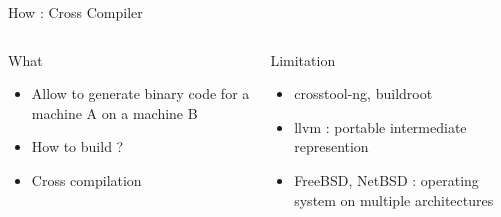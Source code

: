 %
\begin{Frame}{How : Cross Compiler}
  \begin{columns}[t]
    \begin{column}{\BW} %
      \begin{block}{What}
        \begin{itemize}
        \item Allow to generate binary code for a machine A on a
          machine B
        \item How to build ?
        \item Cross compilation
        \end{itemize}
      \end{block} 
    \end{column}
    
    \begin{column}{\BW} %
      \begin{block}{Limitation}
        \begin{itemize}
        \item crosstool-ng, buildroot
        \item llvm : portable intermediate represention
        \item FreeBSD, NetBSD : operating system on multiple architectures
        \end{itemize}
      \end{block}   
    \end{column}
  \end{columns}  
\end{Frame}


